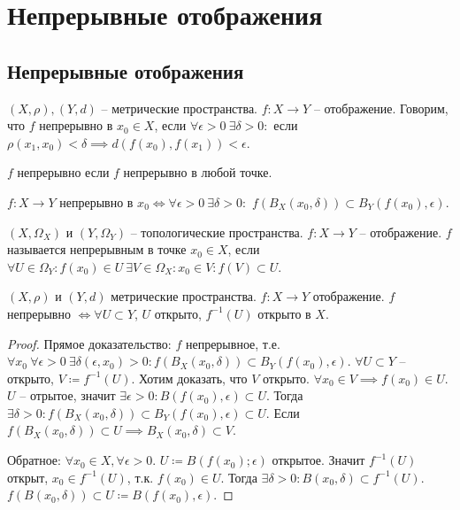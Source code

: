 \documentclass[main]{subfiles}
\begin{document}
\chapter{Непрерывные отображения}
\section{Непрерывные отображения}
\begin{definition}
    $(X, \rho), (Y, d)$ -- метрические пространства. $f: X \to Y$ -- отображение.
    Говорим, что $f$ непрерывно в $x_0 \in X$, если
    $\forall \epsilon > 0\ \exists \delta > 0:$ если $\rho(x_1, x_0) < \delta \implies d(f(x_0), f(x_1)) < \epsilon$.
\end{definition}
\begin{definition}
    $f$ непрерывно если $f$ непрерывно в любой точке.
\end{definition}
\begin{remark}
    $f: X \to Y$ непрерывно в $x_0 \Leftrightarrow \forall \epsilon > 0\ \exists \delta > 0:$
    $f\left(B_X(x_0, \delta)\right) \subset B_Y(f(x_0), \epsilon)$.
\end{remark}

\begin{definition}
    $(X, \Omega_X)$ и $(Y, \Omega_Y)$ -- топологические пространства.
    $f: X \to Y$ -- отображение.
    $f$ называется непрерывным в точке $x_0 \in X$, если $\forall U \in \Omega_Y : f(x_0) \in U\ \exists V \in \Omega_X: x_0 \in V: f(V) \subset U$.
\end{definition}

\begin{theorem}
    $(X, \rho)$ и $(Y, d)$ метрические пространства. $f: X \to Y$ отображение.
    $f$ непрерывно $\Leftrightarrow \forall U \subset Y$, $U$ открыто, $f^{-1}(U)$ открыто в $X$.
\end{theorem}
\begin{proof}
    Прямое доказательство: $f$ непрерывное, т.е.
    $\forall x_0\ \forall \epsilon > 0\ \exists \delta(\epsilon, x_0) > 0: f(B_X(x_0, \delta))\subset B_Y (f(x_0), \epsilon)$.
    $\forall U \subset Y$ -- открыто, $V \coloneqq f^{-1}(U)$.
    Хотим доказать, что $V$ открыто. $\forall x_0 \in V \implies f(x_0) \in U$.
    $U$ -- отрытое, значит $\exists \epsilon > 0: B(f(x_0), \epsilon) \subset U$.
    Тогда $\exists \delta > 0: f(B_X(x_0, \delta)) \subset B_Y(f(x_0), \epsilon) \subset U$.
    Если $f(B_X(x_0, \delta)) \subset U \implies B_X(x_0, \delta) \subset V$.

    Обратное: $\forall x_0 \in X, \forall\epsilon >0.$ $U\coloneqq B(f(x_0); \epsilon)$ открытое.
    Значит $f^{-1}(U)$ открыт, $x_0 \in f^{-1}(U)$, т.к. $f(x_0) \in U$.
    Тогда $\exists \delta > 0: B(x_0, \delta) \subset f^{-1}(U)$.
    $f(B(x_0, \delta)) \subset U \coloneqq B(f(x_0), \epsilon)$.
\end{proof}
\end{document}
